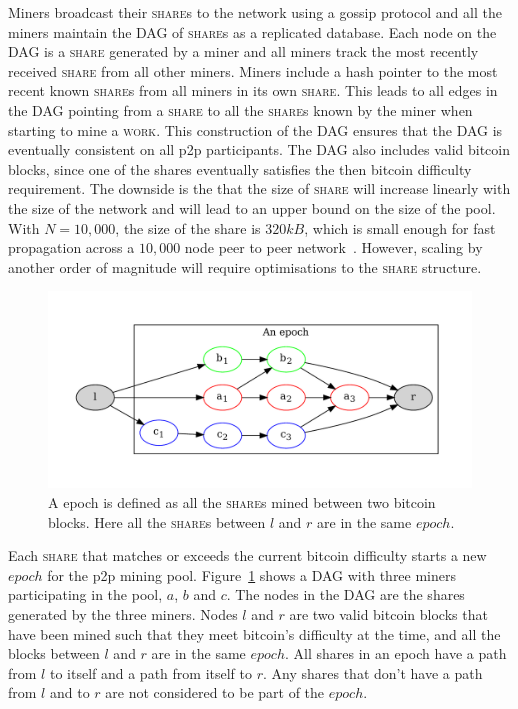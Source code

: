 \documentclass{article}
\begin{document}
Miners broadcast their \textsc{share}s to the network using a gossip
protocol and all the miners maintain the DAG of \textsc{share}s as a
replicated database. Each node on the DAG is a \textsc{share}
generated by a miner and all miners track the most recently received
\textsc{share} from all other miners. Miners include a hash pointer to
the most recent known \textsc{share}s from all miners in its own
\textsc{share}. This leads to all edges in the DAG pointing from a
\textsc{share} to all the \textsc{share}s known by the miner when
starting to mine a \textsc{work}. This construction of the DAG ensures
that the DAG is eventually consistent on all p2p participants. The DAG
also includes valid bitcoin blocks, since one of the shares eventually
satisfies the then bitcoin difficulty requirement. The downside is the
that the size of \textsc{share} will increase linearly with the size
of the network and will lead to an upper bound on the size of the
pool. With $N = 10,000$, the size of the share is $320kB$, which is
small enough for fast propagation across a $10,000$ node peer to peer
network~\cite{information-propagation}. However, scaling by another
order of magnitude will require optimisations to the \textsc{share}
structure.

\begin{figure}
  \includegraphics[width=1.0\textwidth]{epoch}
  \caption{A epoch is defined as all the \textsc{share}s mined between two
    bitcoin blocks. Here all the \textsc{share}s between $l$ and $r$ are in
    the same $epoch$.}\label{fig:epoch}
\end{figure}

Each \textsc{share} that matches or exceeds the current bitcoin
difficulty starts a new $epoch$ for the p2p mining
pool. Figure~\ref{fig:epoch} shows a DAG with three miners
participating in the pool, $a$, $b$ and $c$. The nodes in the DAG are
the shares generated by the three miners. Nodes $l$ and $r$ are two
valid bitcoin blocks that have been mined such that they meet
bitcoin's difficulty at the time, and all the blocks between $l$ and
$r$ are in the same $epoch$. All shares in an epoch have a path from
$l$ to itself and a path from itself to $r$. Any shares that don't
have a path from $l$ and to $r$ are not considered to be part of the
$epoch$.
\end{document}
